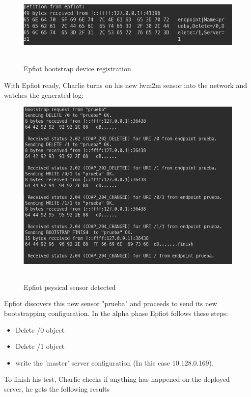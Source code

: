 \begin{figure}[h!]%
\centering
    \includegraphics[width=5.5in]{figures/bs_endpoint_log.png}
~\caption{Epfiot bootstrap device registration}
\label{figure6.14}
\end{figure}

With Epfiot ready, Charlie turns on his new lwm2m sensor into the network and watches the generated log:

\begin{figure}[h!]%
\centering
    \includegraphics[width=5.5in]{figures/bs_endpoint_log2.png}
~\caption{Epfiot psysical sensor detected}
\label{figure6.15}
\end{figure}

Epfiot discovers this new sensor "prueba" and proceeds to send its new bootstrapping configuration.
In the alpha phase Epfiot follows these steps:
\begin{itemize}
    \item Delete /0 object
    \item Delete /1 object
    \item write the 'master' server configuration (In this case 10.128.0.169).
\end{itemize}
\newpage

To finish his test, Charlie checks if anything has happened on the deployed server, he gets the following results

